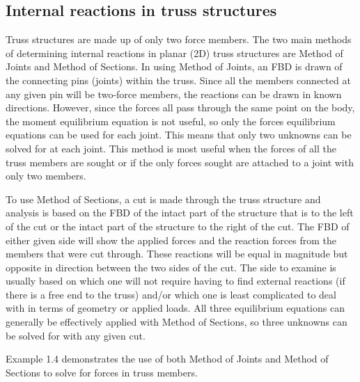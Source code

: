 \documentclass[
  letterpaper,
  DIV=11,
  numbers=noendperiod]{scrreprt}
\theoremstyle{definition}
\theoremstyle{remark}
\begin{document}
\subsection{Internal reactions in truss
structures}\label{internal-reactions-in-truss-structures}

Truss structures are made up of only two force members. The two main
methods of determining internal reactions in planar (2D) truss
structures are Method of Joints and Method of Sections. In using Method
of Joints, an FBD is drawn of the connecting pins (joints) within the
truss. Since all the members connected at any given pin will be
two-force members, the reactions can be drawn in known directions.
However, since the forces all pass through the same point on the body,
the moment equilibrium equation is not useful, so only the forces
equilibrium equations can be used for each joint. This means that only
two unknowns can be solved for at each joint. This method is most useful
when the forces of all the truss members are sought or if the only
forces sought are attached to a joint with only two members.

To use Method of Sections, a cut is made through the truss structure and
analysis is based on the FBD of the intact part of the structure that is
to the left of the cut or the intact part of the structure to the right
of the cut. The FBD of either given side will show the applied forces
and the reaction forces from the members that were cut through. These
reactions will be equal in magnitude but opposite in direction between
the two sides of the cut. The side to examine is usually based on which
one will not require having to find external reactions (if there is a
free end to the truss) and/or which one is least complicated to deal
with in terms of geometry or applied loads. All three equilibrium
equations can generally be effectively applied with Method of Sections,
so three unknowns can be solved for with any given cut.

Example 1.4 demonstrates the use of both Method of Joints and Method of
Sections to solve for forces in truss members.
\end{document}

